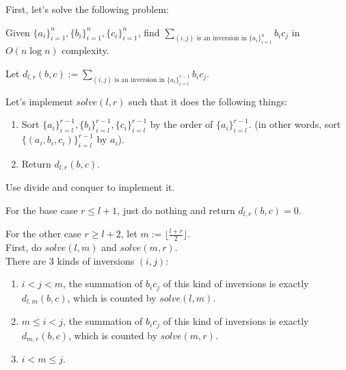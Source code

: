 \begin{pr}

\newcommand{\seq}[3]{\{{#1}_i\}_{i=#2}^{#3}}

First, let's solve the following problem:

Given $\seq a1n, \seq b1n, \seq c1n$, find $\sum_{(i, j)\text{ is an inversion in }\seq a1n}b_ic_j$ in $O(n\log n)$ complexity.

Let $d_{l, r}(b, c):=\sum_{(i, j)\text{ is an inversion in }\seq al{r-1}}b_ic_j$.

Let's implement $solve(l, r)$ such that it does the following things:
\begin{enumerate}
\item Sort $\seq al{r-1}, \seq bl{r-1}, \seq cl{r-1}$ by the order of $\seq al{r-1}$. (in other words, sort $\{(a_i, b_i, c_i)\}_{i=l}^{r-1}$ by $a_i$).
\item Return $d_{l, r}(b, c)$.
\end{enumerate}

Use divide and conquer to implement it.

For the base case $r\leq l+1$, just do nothing and return $d_{l, r}(b, c)=0$.

For the other case $r\geq l+2$, let $m:=\lfloor\frac{l+r}2\rfloor$.\\
First, do $solve(l, m)$ and $solve(m, r)$.\\
There are $3$ kinds of inversions $(i, j)$:
\begin{enumerate}
\item $i<j<m$, the summation of $b_ic_j$ of this kind of inversions is exactly $d_{l, m}(b, c)$, which is counted by $solve(l, m)$.
\item $m\leq i<j$, the summation of $b_ic_j$ of this kind of inversions is exactly $d_{m, r}(b, c)$, which is counted by $solve(m, r)$.
\item $i<m\leq j$.
\end{enumerate}


\end{pr}

